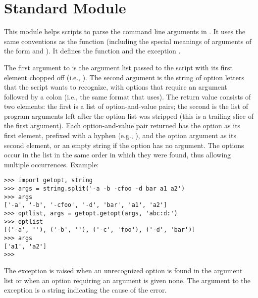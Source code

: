 \section{Standard Module }

This module helps scripts to parse the command line arguments in
.
It uses the same conventions as the \UNIX{}
function (including the special meanings of arguments of the form
\samp{-} and \samp{--}).
It defines the function
and the exception
.

The first argument to
is the argument list passed to the script with its first element
chopped off (i.e.,
).
The second argument is the string of option letters that the
script wants to recognize, with options that require an argument
followed by a colon (i.e., the same format that \UNIX{}
uses).
The return value consists of two elements: the first is a list of
option-and-value pairs; the second is the list of program arguments
left after the option list was stripped (this is a trailing slice of the
first argument).
Each option-and-value pair returned has the option as its first element,
prefixed with a hyphen (e.g.,
),
and the option argument as its second element, or an empty string if the
option has no argument.
The options occur in the list in the same order in which they were
found, thus allowing multiple occurrences.
Example:

\bcode\begin{verbatim}
>>> import getopt, string
>>> args = string.split('-a -b -cfoo -d bar a1 a2')
>>> args
['-a', '-b', '-cfoo', '-d', 'bar', 'a1', 'a2']
>>> optlist, args = getopt.getopt(args, 'abc:d:')
>>> optlist
[('-a', ''), ('-b', ''), ('-c', 'foo'), ('-d', 'bar')]
>>> args
['a1', 'a2']
>>> 
\end{verbatim}\ecode

The exception
is raised when an unrecognized option is found in the argument list or
when an option requiring an argument is given none.
The argument to the exception is a string indicating the cause of the
error.
